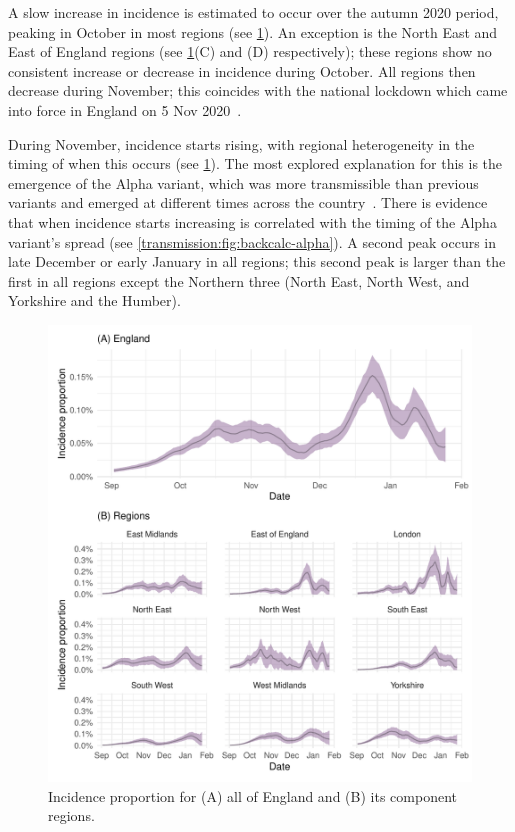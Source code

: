 \documentclass[thesis.tex]{subfiles}
\begin{document}
A slow increase in incidence is estimated to occur over the autumn 2020 period, peaking in October in most regions (see \cref{transmission:fig:backcalc-regions}).
An exception is the North East and East of England regions (see \cref{transmission:fig:backcalc-regions}(C) and (D) respectively); these regions show no consistent increase or decrease in incidence during October.
All regions then decrease during November; this coincides with the national lockdown which came into force in England on 5 Nov 2020~\autocite{ifgTimeline}.

During November, incidence starts rising, with regional heterogeneity in the timing of when this occurs (see \cref{transmission:fig:backcalc-regions}).
The most explored explanation for this is the emergence of the Alpha variant, which was more transmissible than previous variants and emerged at different times across the country~\autocite{walkerTracking,daviesEstimated,lythgoeLineage}.
There is evidence that when incidence starts increasing is correlated with the timing of the Alpha variant's spread (see \cref{transmission:fig:backcalc-alpha}).
A second peak occurs in late December or early January in all regions; this second peak is larger than the first in all regions except the Northern three (North East, North West, and Yorkshire and the Humber).
\begin{figure}
    \includegraphics{transmission/backcalc-regions}
    \caption[Incidence estimated using backcalculation by region]{%
        Incidence proportion for (A) all of England and (B) its component regions.
    }
    \label{transmission:fig:backcalc-regions}
\end{figure}
\end{document}
